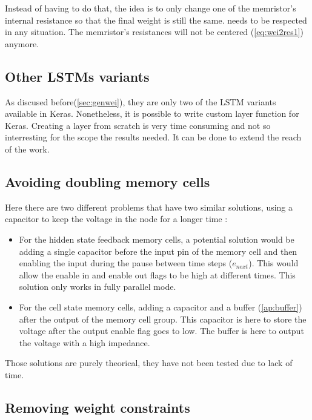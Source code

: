 Instead of having to do that, the idea is to only change one of the memristor's internal resistance so that the final weight is still the same.  needs to be respected in any situation. The memristor's resistances will not be centered (\cref{eq:wei2res1}) anymore.

\subsection{Other \acp{LSTM} variants}

As discused before(\cref{sec:genwei}), they are only two of the \ac{LSTM} variants available in Keras. Nonetheless, it is possible to write custom layer function for Keras. Creating a layer from scratch is very time consuming and not so interresting for the scope the results needed. It can be done to extend the reach of the work.

\subsection{Avoiding doubling memory cells}\label{subsec:noDoubleMemcell}

Here there are two different problems that have two similar solutions, using a capacitor to keep the voltage in the node for a longer time :
\begin{itemize}
  \item For the hidden state feedback memory cells, a potential solution would be adding a single capacitor before the input pin of the memory cell and then enabling the input during the pause between time steps ($e_{next}$). This would allow the enable in and enable out flags to be high at different times. This solution only works in fully parallel mode.
  \item For the cell state memory cells, adding a capacitor and a buffer (\cref{ap:buffer}) after the output of the memory cell group. This capacitor is here to store the voltage after the output enable flag goes to low. The buffer is here to output the voltage with a high impedance.
\end{itemize}

Those solutions are purely theorical, they have not been tested due to lack of time.

\subsection{Removing weight constraints}\label{subsec:noCons}

